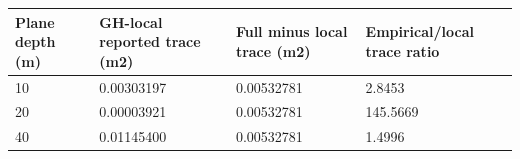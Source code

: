 \begin{tabular}{llll}
\hline
Plane depth (m) & GH-local reported trace (m2) & Full minus local trace (m2) & Empirical/local trace ratio \\
\hline
10 & 0.00303197 & 0.00532781 & 2.8453 \\
20 & 0.00003921 & 0.00532781 & 145.5669 \\
40 & 0.01145400 & 0.00532781 & 1.4996 \\
\hline
\end{tabular}
